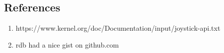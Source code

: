 \documentclass[titlepage]{article}
\begin{document}
\subsection{References}
\begin{enumerate}[(1)]
\item https://www.kernel.org/doc/Documentation/input/joystick-api.txt
\item rdb had a nice gist on github.com
\end{enumerate}
\end{document}
